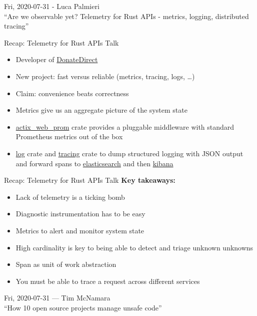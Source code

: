 \documentclass{beamer}
\begin{document}
\begin{frame}[standout]
  Fri, 2020-07-31 - Luca Palmieri \\
  \enquote{Are we observable yet? Telemetry for Rust APIs - metrics, logging, distributed tracing}
\end{frame}

\begin{frame}[fragile]{Recap: Telemetry for Rust APIs Talk}
  \begin{itemize}
    \item Developer of \href{https://www.donatedirect.org.au/who-we-are.html}{DonateDirect}
    \item New project: fast versus reliable (metrics, tracing, logs, \dots)
    \item Claim: convenience beats correctness
    \item Metrics give us an aggregate picture of the system state
    \item \href{https://crates.io/crates/actix-web-prom}{actix\_web\_prom} crate provides a pluggable middleware with standard Prometheus metrics out of the box
    \item \href{https://docs.rs/log/0.4.6/log/}{log} crate and \href{https://crates.io/crates/tracing}{tracing} crate to dump structured logging with JSON output and forward spans to \href{https://www.elastic.co/what-is/elasticsearch}{elasticsearch} and then \href{https://www.elastic.co/kibana}{kibana}
  \end{itemize}
\end{frame}

\begin{frame}[fragile]{Recap: Telemetry for Rust APIs Talk}
  \textbf{Key takeaways:}
  \begin{itemize}
  \item Lack of telemetry is a ticking bomb
  \item Diagnostic instrumentation has to be easy
  \item Metrics to alert and monitor system state
  \item High cardinality is key to being able to detect and triage unknown unknowns
  \item Span as unit of work abstraction
  \item You must be able to trace a request across different services
  \end{itemize}
\end{frame}

\begin{frame}[standout]
  Fri, 2020-07-31 --- Tim McNamara \\
  \enquote{How 10 open source projects manage unsafe code}
\end{frame}
\end{document}
